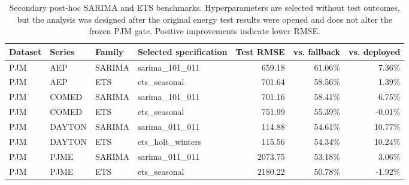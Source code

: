 \begin{table}[htbp]
\centering
\caption{Secondary post-hoc SARIMA and ETS benchmarks. Hyperparameters are selected without test outcomes, but the analysis was designed after the original energy test results were opened and does not alter the frozen PJM gate. Positive improvements indicate lower RMSE.}
\label{tab:posthoc_energy}
\footnotesize
\setlength{\tabcolsep}{4pt}
\begin{tabular}{ll ll rrr}
\toprule
Dataset & Series & Family & Selected specification & Test RMSE & vs. fallback & vs. deployed \\
\midrule
PJM & AEP & SARIMA & sarima\_101\_011 & 659.18 & 61.06\% & 7.36\% \\
PJM & AEP & ETS & ets\_seasonal & 701.64 & 58.56\% & 1.39\% \\
PJM & COMED & SARIMA & sarima\_101\_011 & 701.16 & 58.41\% & 6.75\% \\
PJM & COMED & ETS & ets\_seasonal & 751.99 & 55.39\% & -0.01\% \\
PJM & DAYTON & SARIMA & sarima\_011\_011 & 114.88 & 54.61\% & 10.77\% \\
PJM & DAYTON & ETS & ets\_holt\_winters & 115.56 & 54.34\% & 10.24\% \\
PJM & PJME & SARIMA & sarima\_011\_011 & 2073.75 & 53.18\% & 3.06\% \\
PJM & PJME & ETS & ets\_seasonal & 2180.22 & 50.78\% & -1.92\% \\
\bottomrule
\end{tabular}
\end{table}
